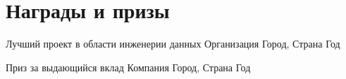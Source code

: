 \section{Награды и призы}

\begin{cvhonors}
  \cvhonor
    {Лучший проект в области инженерии данных} %
    {Организация} %
    {Город, Страна} %
    {Год} %

  \cvhonor
    {Приз за выдающийся вклад} %
    {Компания} %
    {Город, Страна} %
    {Год} %
\end{cvhonors}